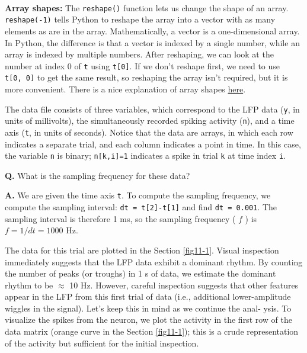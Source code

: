 \documentclass[11pt]{article}
\begin{document}
    \begin{center}
    \end{center}
    { \hspace*{\fill} \\}
    
    \textbf{Array shapes:} The \texttt{reshape()} function lets us change
the shape of an array. \texttt{reshape(-1)} tells Python to reshape the
array into a vector with as many elements as are in the array.
Mathematically, a vector is a one-dimensional array. In Python, the
difference is that a vector is indexed by a single number, while an
array is indexed by multiple numbers. After reshaping, we can look at
the number at index 0 of \texttt{t} using \texttt{t{[}0{]}}. If we don't
reshape first, we need to use \texttt{t{[}0,\ 0{]}} to get the same
result, so reshaping the array isn't required, but it is more
convenient. There is a nice explanation of array shapes
\href{https://stackoverflow.com/questions/22053050/difference-between-numpy-array-shape-r-1-and-r\#answer-22074424}{here}.

    The data file consists of three variables, which correspond to the LFP
data (\texttt{y}, in units of millivolts), the simultaneously recorded
spiking activity (\texttt{n}), and a time axis (\texttt{t}, in units of
seconds). Notice that the data are arrays, in which each row indicates a
separate trial, and each column indicates a point in time. In this case,
the variable \texttt{n} is binary; \texttt{n{[}k,i{]}=1} indicates a
spike in trial \texttt{k} at time index \texttt{i}.

    \textbf{Q.} What is the sampling frequency for these data?

\textbf{A.} We are given the time axis \texttt{t}. To compute the
sampling frequency, we compute the sampling interval:
\texttt{dt\ =\ t{[}2{]}-t{[}1{]}} and find \texttt{dt\ =\ 0.001}. The
sampling interval is therefore 1 ms, so the sampling frequency ( \(f\) )
is \(f = 1/dt = 1000\) Hz.

    The data for this trial are plotted in the Section \ref{fig11-1}. Visual
inspection immediately suggests that the LFP data exhibit a dominant
rhythm. By counting the number of peaks (or troughs) in 1 s of data, we
estimate the dominant rhythm to be \(\approx\) 10 Hz. However, careful
inspection suggests that other features appear in the LFP from this
first trial of data (i.e., additional lower-amplitude wiggles in the
signal). Let's keep this in mind as we continue the anal- ysis. To
visualize the spikes from the neuron, we plot the activity in the first
row of the data matrix (orange curve in the Section \ref{fig11-1}); this
is a crude representation of the activity but sufficient for the initial
inspection.
\end{document}
